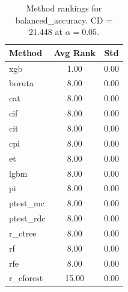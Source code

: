 \begin{table}[h]
\centering
\caption{Method rankings for balanced_accuracy. CD = 21.448 at $\alpha=0.05$.}
\label{tab:ranks_balanced_accuracy}
\begin{tabular}{lcc}
\toprule
Method & Avg Rank & Std \\
\midrule
xgb & 1.00 & 0.00 \\
boruta & 8.00 & 0.00 \\
cat & 8.00 & 0.00 \\
cif & 8.00 & 0.00 \\
cit & 8.00 & 0.00 \\
cpi & 8.00 & 0.00 \\
et & 8.00 & 0.00 \\
lgbm & 8.00 & 0.00 \\
pi & 8.00 & 0.00 \\
ptest_mc & 8.00 & 0.00 \\
ptest_rdc & 8.00 & 0.00 \\
r_ctree & 8.00 & 0.00 \\
rf & 8.00 & 0.00 \\
rfe & 8.00 & 0.00 \\
r_cforest & 15.00 & 0.00 \\
\bottomrule
\end{tabular}
\end{table}